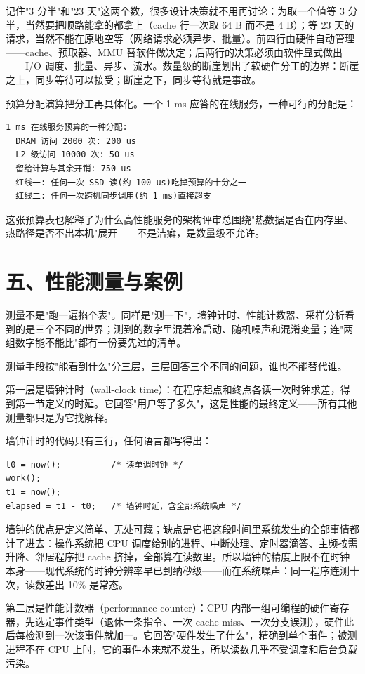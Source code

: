 记住"3 分半"和"23 天"这两个数，很多设计决策就不用再讨论：为取一个值等 3 分半，当然要把顺路能拿的都拿上（cache 行一次取 64 B 而不是 4 B）；等 23 天的请求，当然不能在原地空等（网络请求必须异步、批量）。前四行由硬件自动管理——cache、预取器、MMU 替软件做决定；后两行的决策必须由软件显式做出——I/O 调度、批量、异步、流水。数量级的断崖划出了软硬件分工的边界：断崖之上，同步等待可以接受；断崖之下，同步等待就是事故。

预算分配演算把分工再具体化。一个 1 ms 应答的在线服务，一种可行的分配是：

\begin{lstlisting}
1 ms 在线服务预算的一种分配:
  DRAM 访问 2000 次: 200 us
  L2 级访问 10000 次: 50 us
  留给计算与其余开销: 750 us
  红线一: 任何一次 SSD 读(约 100 us)吃掉预算的十分之一
  红线二: 任何一次跨机同步调用(约 1 ms)直接超支
\end{lstlisting}

这张预算表也解释了为什么高性能服务的架构评审总围绕"热数据是否在内存里、热路径是否不出本机"展开——不是洁癖，是数量级不允许。

\section{五、性能测量与案例}

测量不是"跑一遍掐个表"。同样是"测一下"，墙钟计时、性能计数器、采样分析看到的是三个不同的世界；测到的数字里混着冷启动、随机噪声和混淆变量；连"两组数字能不能比"都有一份要先过的清单。

测量手段按"能看到什么"分三层，三层回答三个不同的问题，谁也不能替代谁。

第一层是墙钟计时（wall-clock time）：在程序起点和终点各读一次时钟求差，得到第一节定义的时延。它回答"用户等了多久"，这是性能的最终定义——所有其他测量都只是为它找解释。

墙钟计时的代码只有三行，任何语言都写得出：

\begin{lstlisting}
t0 = now();          /* 读单调时钟 */
work();
t1 = now();
elapsed = t1 - t0;   /* 墙钟时延，含全部系统噪声 */
\end{lstlisting}

墙钟的优点是定义简单、无处可藏；缺点是它把这段时间里系统发生的全部事情都计了进去：操作系统把 CPU 调度给别的进程、中断处理、定时器滴答、主频按需升降、邻居程序把 cache 挤掉，全部算在读数里。所以墙钟的精度上限不在时钟本身——现代系统的时钟分辨率早已到纳秒级——而在系统噪声：同一程序连测十次，读数差出 10\% 是常态。

第二层是性能计数器（performance counter）：CPU 内部一组可编程的硬件寄存器，先选定事件类型（退休一条指令、一次 cache miss、一次分支误测），硬件此后每检测到一次该事件就加一。它回答"硬件发生了什么"，精确到单个事件；被测进程不在 CPU 上时，它的事件本来就不发生，所以读数几乎不受调度和后台负载污染。

